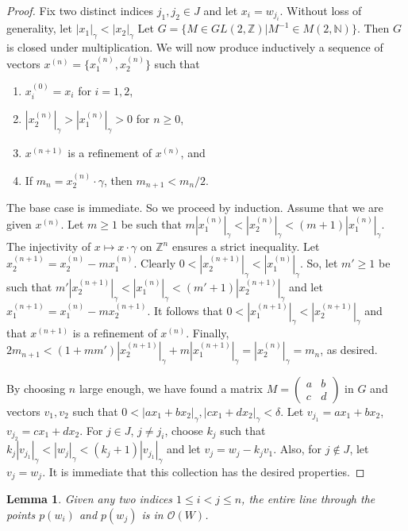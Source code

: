 \documentclass[notitlepage, 10pt]{article}
\theoremstyle{defin}
\theoremstyle{theo}
\newtheorem{lem}{Lemma}[defn]
\theoremstyle{rema}
\newcommand{\N}{\mathbb{N}}
\newcommand{\Z}{\mathbb{Z}}
\newcommand{\cO}{\mathcal{O}}
\begin{document}
\begin{proof}
    Fix two distinct indices $j_1,j_2 \in J$ and let $x_i = w_{j_i}$. Without loss of generality, let $|x_1|_\gamma < |x_2|_\gamma $ Let $G=\{M\in GL(2,\Z) | M^{-1}\in M(2,\N)\}$. Then $G$ is closed under multiplication. We will now produce inductively a sequence of vectors $x^{(n)} = \{x_1^{(n)}, x_2^{(n)}\}$ such that
    \begin{enumerate}
        \item $x^{(0)}_i = x_i$ for $i=1,2$,
        \item $|x^{(n)}_2|_\gamma>|x_1^{(n)}|_\gamma>0$ for $n\geq 0$,
        \item $x^{(n+1)}$ is a refinement of $x^{(n)}$, and
        \item If $m_n = x^{(n)}_2 \cdot \gamma$, then $m_{n+1} < m_{n}/2$.
    \end{enumerate}
The base case is immediate. So we proceed by induction. Assume that we are given $x^{(n)}$. Let $m\geq 1$ be such that $m|x^{(n)}_1|_\gamma<|x_2^{(n)}|_\gamma<(m+1)|x_1^{(n)}|_{\gamma}$. The injectivity of $x \mapsto x\cdot \gamma$ on $\Z^n$ ensures a strict inequality. Let $x^{(n+1)}_2 = x^{(n)}_2-mx_1^{(n)}$. Clearly $0<|x^{(n+1)}_2|_\gamma < |x_1^{(n)}|_\gamma$. So, let $m'\geq 1$ be such that
$m'|x^{(n+1)}_2|_\gamma<|x_1^{(n)}|_\gamma<(m'+1)|x_2^{(n+1)}|_{\gamma}$ and let $x_1^{(n+1)} = x_1^{(n)} - mx_2^{(n+1)}$. It follows that $0<|x_1^{(n+1)}|_\gamma< |x_2^{(n+1)}|_\gamma$ and that $x^{(n+1)}$ is a refinement of $x^{(n)}$. Finally, $2m_{n+1} < (1+mm')|x_2^{(n+1)}|_\gamma + m |x_1^{(n+1)}|_\gamma = |x_2^{(n)}|_\gamma = m_n$, as desired.

By choosing $n$ large enough, we have found a matrix $M = \begin{pmatrix}
    a& b\\c & d
\end{pmatrix}$ in $G$ and vectors $v_1, v_2$ such that $0<|ax_1+bx_2|_\gamma,|cx_1+dx_2|_\gamma<\delta$. Let $v_{j_1}=ax_1+bx_2$, $v_{j_2}=cx_1+dx_2$. For $j\in J$, $j\neq j_i$, choose $k_j$ such that $k_j |v_{j_1}|_\gamma< |w_j|_\gamma<(k_j+1) |v_{j_1}|_\gamma$ and let $v_j = w_j - k_jv_1$. Also, for $j\notin J$, let $v_j=w_j$. It is immediate that this collection has the desired properties.
\end{proof}


\begin{lem}
    \label{lem5}
    Given any two indices $1\leq i < j \leq n$, the entire line through the points $p(w_i)$ and $p(w_j)$ is in $\cO(W)$.
\end{lem}
\end{document}
